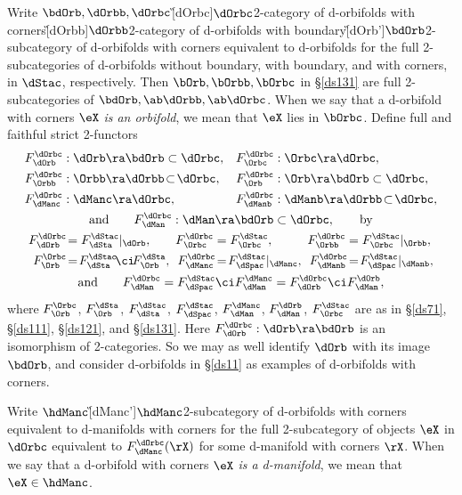 \documentclass{article}
\begin{document}
\begin{dfn}
Write $\bdOrb,\dOrbb,\dOrbc$\G[dOrbc]{$\dOrbc$}{2-category of
d-orbifolds with corners}\G[dOrbb]{$\dOrbb$}{2-category of
d-orbifolds with boundary}\G[dOrb']{$\bdOrb$}{2-subcategory of
d-orbifolds with corners equivalent to d-orbifolds} for the full
2-subcategories of d-orbifolds without boundary, with boundary, and
with corners, in $\dStac$, respectively. Then $\bOrb,\bOrbb,\bOrbc$ in \S\ref{ds131} are full
2-subcategories of $\bdOrb,\ab\dOrbb,\ab \dOrbc$. When we say that a
d-orbifold with corners $\eX$ {\it is an orbifold}, we mean that $\eX$ lies in $\bOrbc$.
Define full and faithful strict
2-functors
\begin{gather*}
\begin{aligned}
F_\dOrb^\dOrbc&:\dOrb\ra\bdOrb\subset\dOrbc, &
F_\Orbc^\dOrbc&:\Orbc\ra\dOrbc, \\
F_\Orbb^\dOrbc&:\Orbb\ra\dOrbb\!\subset\!\dOrbc, &
F_\Orb^\dOrbc&:\Orb\ra\bdOrb\subset\dOrbc, \\
F_\dManc^\dOrbc&:\dManc\ra\dOrbc, & F_\dManb^\dOrbc&:\dManb\ra\dOrbb
\!\subset\!\dOrbc,
\end{aligned}\\
\text{and}\qquad F_\dMan^\dOrbc:\dMan\ra\bdOrb\subset\dOrbc,
\qquad \text{by} \\
\begin{aligned}
F_\dOrb^\dOrbc\!&=F_\dSta^\dStac\vert_{\dOrb}, &
F_\Orbc^\dOrbc&=F_\Orbc^\dStac, &
F_\Orbb^\dOrbc&=F_\Orbc^\dStac\vert_{\smash{\Orbb}}, \\
F_\Orb^\Orbc\!&=\!F_\dSta^\dStac\!\ci\!F_\Orb^\dSta,\!\!\! &
F_\dManc^\dOrbc\!&=\!F_\dSpac^\dStac\vert_{\dManc},\!\!\! &
F_\dManb^\dOrbc\!&=\!F_\dSpac^\dStac\vert_{\dManb},
\end{aligned}\\
\text{and}\qquad F_\dMan^\dOrbc=F_\dSpac^\dStac\ci
F_\dMan^\dManc=F_\dOrb^\dOrbc\ci F_\dMan^\dOrb,
\end{gather*}
where $F_\Orb^\Orbc$, $F_\Orb^\dSta$, $F_\dSta^\dStac$,
$F_\dSpac^\dStac$, $F_\dMan^\dManc$, $F_\dMan^\dOrb$,
$F_\Orbc^\dStac$ are as in \S\ref{ds71}, \S\ref{ds111},
\S\ref{ds121}, and \S\ref{ds131}. Here
$F_\dOrb^\dOrbc:\dOrb\ra\bdOrb$ is an isomorphism of 2-categories.
So we may as well identify $\dOrb$ with its image $\bdOrb$, and
consider d-orbifolds in \S\ref{ds11} as examples of d-orbifolds with
corners.

Write $\hdManc$\G[dManc']{$\hdManc$}{2-subcategory of d-orbifolds
with corners equivalent to d-manifolds with corners} for the full
2-subcategory of objects $\eX$ in $\dOrbc$ equivalent to
$F_\dManc^\dOrbc(\rX)$ for some d-manifold with corners $\rX$. When
we say that a d-orbifold with corners $\eX$ {\it is a
d-manifold}, we mean
that~$\eX\in\hdManc$.


\end{dfn}
\end{document}
